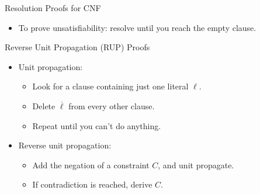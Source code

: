 \documentclass{beamer}
\begin{document}
\begin{frame}{Resolution Proofs for CNF}
{    \begin{itemize}
        \item To prove unsatisfiability: resolve until you reach the empty clause.
    \end{itemize}
}
\end{frame}

\begin{frame}{Reverse Unit Propagation (RUP) Proofs}
    \begin{itemize}
        \item Unit propagation:
            \begin{itemize}
                \item Look for a clause containing just one literal $\ell$.
                \item Delete $\overline{\ell}$ from every other clause.
                \item Repeat until you can't do anything.
            \end{itemize}
        \item Reverse unit propagation:
            \begin{itemize}
                \item Add the negation of a constraint $C$, and unit propagate.
                \item If contradiction is reached, derive $C$.
            \end{itemize}
    \end{itemize}
\end{frame}
\end{document}
